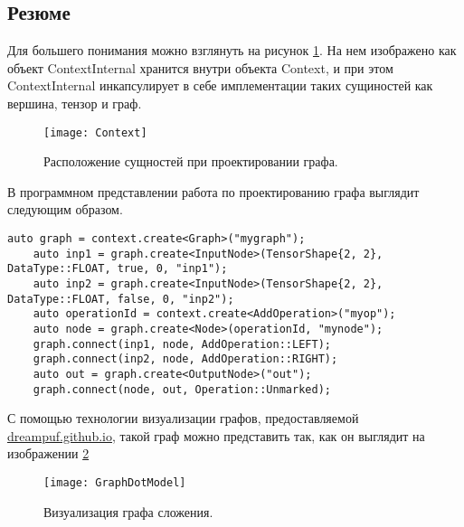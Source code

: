\subsection{Резюме}
Для большего понимания можно взглянуть на рисунок \ref{Context}. На нем изображено как объект ContextInternal хранится внутри объекта Context, и при этом ContextInternal инкапсулирует в себе имплементации таких сущиностей как вершина, тензор и граф.
\begin{figure}[H]
    \centering
    \texttt{[image: Context]}
    \caption{Расположение сущностей при проектировании графа.}
    \label{Context}
\end{figure}
В программном представлении работа по проектированию графа выглядит следующим образом.
\begin{lstlisting}[caption=Пример построения графа]
    auto graph = context.create<Graph>("mygraph");
    auto inp1 = graph.create<InputNode>(TensorShape{2, 2}, DataType::FLOAT, true, 0, "inp1");
    auto inp2 = graph.create<InputNode>(TensorShape{2, 2}, DataType::FLOAT, false, 0, "inp2");
    auto operationId = context.create<AddOperation>("myop");
    auto node = graph.create<Node>(operationId, "mynode");
    graph.connect(inp1, node, AddOperation::LEFT);
    graph.connect(inp2, node, AddOperation::RIGHT);
    auto out = graph.create<OutputNode>("out");
    graph.connect(node, out, Operation::Unmarked);
\end{lstlisting}
\par
С помощью технологии визуализации графов, предоставляемой \href{https://dreampuf.github.io/GraphvizOnline}{dreampuf.github.io}, такой граф можно представить так, как он выглядит на изображении \ref{GraphDotModel}
\begin{figure}[H]
    \centering
    \texttt{[image: GraphDotModel]}
    \caption{Визуализация графа сложения.}
    \label{GraphDotModel}
\end{figure}